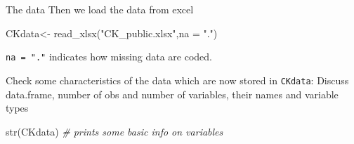 \documentclass[
  ignorenonframetext,
]{beamer}
\newenvironment{Shaded}{\begin{snugshade}}{\end{snugshade}}
\newcommand{\AttributeTok}[1]{\textcolor[rgb]{0.77,0.63,0.00}{#1}}
\newcommand{\CommentTok}[1]{\textcolor[rgb]{0.56,0.35,0.01}{\textit{#1}}}
\newcommand{\FunctionTok}[1]{\textcolor[rgb]{0.00,0.00,0.00}{#1}}
\newcommand{\NormalTok}[1]{#1}
\newcommand{\OtherTok}[1]{\textcolor[rgb]{0.56,0.35,0.01}{#1}}
\newcommand{\StringTok}[1]{\textcolor[rgb]{0.31,0.60,0.02}{#1}}
\begin{document}
\begin{frame}[fragile]{The data}
\protect\hypertarget{the-data}{}
Then we load the data from excel

\begin{Shaded}
\begin{Highlighting}[]
\NormalTok{CKdata}\OtherTok{\textless{}{-}} \FunctionTok{read\_xlsx}\NormalTok{(}\StringTok{"CK\_public.xlsx"}\NormalTok{,}\AttributeTok{na =} \StringTok{"."}\NormalTok{)}
\end{Highlighting}
\end{Shaded}

\texttt{na = "."} indicates how missing data are coded.

Check some characteristics of the data which are now stored in
\texttt{CKdata}:
\textcolor{student}{Discuss data.frame, number of obs and number of variables, their names and variable types}

\scriptsize

\begin{Shaded}
\begin{Highlighting}[]
\FunctionTok{str}\NormalTok{(CKdata)  }\CommentTok{\# prints some basic info on variables}
\end{Highlighting}
\end{Shaded}


\end{frame}
\end{document}
